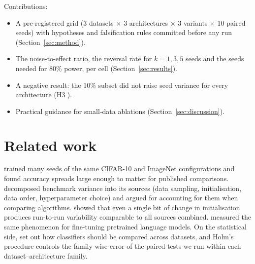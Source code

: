 \documentclass[10pt]{article}
\begin{document}
Contributions:
\begin{itemize}
  \item A pre-registered grid (3 datasets $\times$ 3 architectures $\times$ 3
    variants $\times$ 10 paired seeds) with hypotheses and falsification rules
    committed before any run (Section~\ref{sec:method}).
  \item The noise-to-effect ratio, the reversal rate for $k=1,3,5$ seeds and the
    seeds needed for 80\% power, per cell (Section~\ref{sec:results}).
  \item A negative result: the 10\% subset did not raise seed variance for every
    architecture (H3 \HThree{}).
  \item Practical guidance for small-data ablations (Section~\ref{sec:discussion}).
\end{itemize}

\section{Related work}

\citet{picard2021seed} trained many seeds of the same CIFAR-10 and ImageNet
configurations and found accuracy spreads large enough to matter for published
comparisons. \citet{bouthillier2021accounting} decomposed benchmark variance
into its sources (data sampling, initialisation, data order, hyperparameter
choice) and argued for accounting for them when comparing algorithms.
\citet{summers2021nondeterminism} showed that even a single bit of change in
initialisation produces run-to-run variability comparable to all sources
combined. \citet{dodge2020finetuning} measured the same phenomenon for
fine-tuning pretrained language models. On the statistical side,
\citet{demsar2006statistical} set out how classifiers should be compared across
datasets, and Holm's procedure \citep{holm1979simple} controls the family-wise
error of the paired tests we run within each dataset--architecture family.
\end{document}
